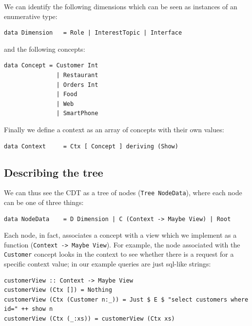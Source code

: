 \documentclass[12pt,a4]{article}
\begin{document}
We can identify the following dimensions which can be seen as instances of an enumerative type: 

\begin{verbatim}
data Dimension   = Role | InterestTopic | Interface
\end{verbatim}

and the following concepts:

\begin{verbatim}
data Concept = Customer Int
               | Restaurant
               | Orders Int
               | Food 
               | Web 
               | SmartPhone
\end{verbatim}

Finally we define a context as an array of concepts with their own values:

\begin{verbatim}
data Context     = Ctx [ Concept ] deriving (Show)
\end{verbatim}

\subsection{Describing the tree}
\label{sec:orgheadline2}

We can thus see the CDT as a tree of nodes (\texttt{Tree NodeData}), where each node can
be one of three things:

\begin{verbatim}
data NodeData    = D Dimension | C (Context -> Maybe View) | Root
\end{verbatim}

Each node, in fact, associates a concept with a view which we implement as a
function (\texttt{Context -> Maybe View}). For example, the node associated with the
\texttt{Customer} concept looks in the context to see whether there is a request for a
specific context value; in our example queries are just sql-like strings:

\begin{verbatim}
customerView :: Context -> Maybe View
customerView (Ctx []) = Nothing
customerView (Ctx (Customer n:_)) = Just $ E $ "select customers where id=" ++ show n
customerView (Ctx (_:xs)) = customerView (Ctx xs)
\end{verbatim}
\end{document}
